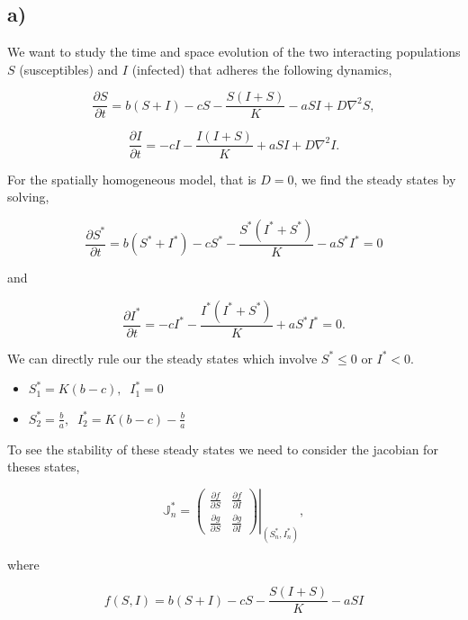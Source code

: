 \subsection*{a)}

We want to study the time and space evolution of the two interacting populations $S$ (susceptibles) and $I$ (infected) that adheres the following dynamics,

\begin{equation}
\label{eq:partSt}
\frac{\partial S}{\partial t} = b(S+I)-cS -\frac{S(I+S)}{K}-aSI + D\nabla^2S,
\end{equation}

\begin{equation}
\label{eq:partIt}
\frac{\partial I}{\partial t}= -cI -\frac{I(I+S)}{K}+aSI +D\nabla^2I.
\end{equation}

For the spatially homogeneous model, that is $D=0$, we find the steady states by solving,

$$
\frac{\partial S^*}{\partial t}=b(S^*+I^*)-cS^*-\frac{S^*(I^*+S^*)}{K}-aS^*I^* =0
$$

and

$$
\frac{\partial I^*}{\partial t}=-cI^*-\frac{I^*(I^*+S^*)}{K}+aS^*I^*=0.
$$

We can directly rule our the steady states which involve $S^*\leq0$ or $I^*<0$.

\begin{itemize}
\item $S^*_1=K(b-c), \;\; I^*_1=0$
\item $S^*_2=\frac{b}{a}, \;\; I^*_2=K(b-c)-\frac{b}{a}$ 
\end{itemize}



To see the stability of these steady states we need to consider the jacobian for theses states,

\begin{equation}
\mathbb{J}^*_n=\left.\left(
\begin{array}{cc}
\frac{\partial f}{\partial S} & \frac{\partial f}{\partial I} \\
\frac{\partial g}{\partial S} & \frac{\partial g}{\partial I}
\end{array}\right)\right|_{(S^*_n,I^*_n)},
\end{equation}

where 

\begin{equation}
f(S,I)=b(S+I)-cS-\frac{S(I+S)}{K}-aSI
\end{equation}

